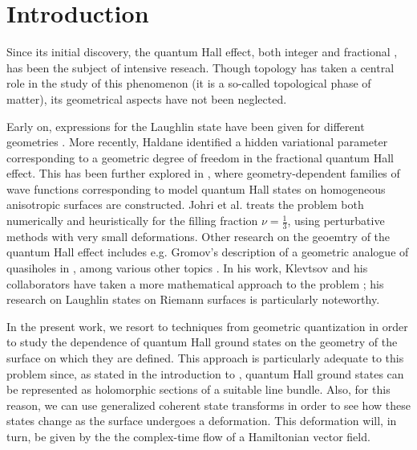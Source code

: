 \documentclass[notas.tex]{subfiles}
\begin{document}
\chapter{Introduction}

Since its initial discovery, the quantum Hall effect, both integer \cite{klitzing_new_1980} and fractional \cite{tsui_two-dimensional_1982}, has been the subject of intensive reseach. Though topology has taken a central role in the study of this phenomenon (it is a so-called topological phase of matter), its geometrical aspects have not been neglected. 

Early on, expressions for the Laughlin state \cite{laughlin_anomalous_1983} have been given for different geometries \cite{azuma_explicit_1994, haldane_periodic_1985,haldane_fractional_1983}. More recently, Haldane identified a hidden variational parameter corresponding to a geometric degree of freedom \cite{haldane_geometrical_2011} in the fractional quantum Hall effect. This has been further explored in \cite{qiu_model_2012}, where geometry-dependent families of wave functions corresponding to model quantum Hall states on homogeneous anisotropic surfaces are constructed. Johri et al. \cite{johri_probing_2016} treats the problem both numerically and heuristically for the filling fraction $\nu = \frac{1}{3}$, using perturbative methods with very small deformations. Other research on the geoemtry of the quantum Hall effect includes e.g. Gromov's description of a geometric analogue of quasiholes in \cite{gromov_geometric_2016}, among various other topics \cite{ferrari_fqhe_2014, gromov_investigating_2017, gromov_bimetric_2017, liu_geometric_2018, yang_three-body_2018}. In his work, Klevtsov and his collaborators have taken a more mathematical approach to the problem \cite{ klevtsov_quantum_2017, klevtsov_laughlin_2019}; his research on Laughlin states on Riemann surfaces \cite{klevtsov_laughlin_2019} is particularly noteworthy.

In the present work, we resort to techniques from geometric quantization in order to study the dependence of quantum Hall ground states on the geometry of the surface on which they are defined. This approach is particularly adequate to this problem since, as stated in the introduction to , quantum Hall ground states can be represented as holomorphic sections of a suitable line bundle. Also, for this reason, we can use generalized coherent state transforms in order to see how these states change as the surface undergoes a deformation. This deformation will, in turn, be given by the  the complex-time flow of a Hamiltonian vector field.
\end{document}
